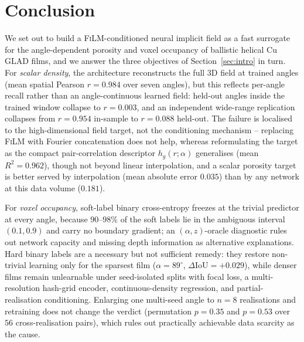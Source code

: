 \documentclass[aip,amsmath,amssymb,reprint]{revtex4-1}
\renewcommand{\ang}{\ensuremath{\alpha}} %
\newcommand{\iou}{\ensuremath{\mathrm{IoU}}}
\newcommand{\film}{\textsc{FiLM}}
\begin{document}
\section{Conclusion}
\label{sec:conclusion}

We set out to build a \film{}-conditioned neural implicit field as a fast
surrogate for the angle-dependent porosity and voxel occupancy of ballistic
helical Cu GLAD films, and we answer the three objectives of
Section~\ref{sec:intro} in turn. For \emph{scalar density}, the architecture
reconstructs the full 3D field at trained angles (mean spatial Pearson
$r = 0.984$ over seven angles), but this reflects per-angle recall rather than
an angle-continuous learned field: held-out angles inside the trained window
collapse to $r = 0.003$, and an independent wide-range replication collapses
from $r = 0.954$ in-sample to $r = 0.088$ held-out. The failure is localised to
the high-dimensional field target, not the conditioning mechanism -- replacing
\film{} with Fourier concatenation does not help, whereas reformulating the
target as the compact pair-correlation descriptor $h_g(r;\ang)$ generalises
(mean $R^2 = 0.962$), though not beyond linear interpolation, and a scalar
porosity target is better served by interpolation (mean absolute error $0.035$)
than by any network at this data volume ($0.181$).

For \emph{voxel occupancy}, soft-label binary cross-entropy freezes at the
trivial predictor at every angle, because $90$--$98\%$ of the soft labels lie in
the ambiguous interval $(0.1,0.9)$ and carry no boundary gradient; an
$(\alpha,z)$-oracle diagnostic rules out network capacity and missing depth
information as alternative explanations. Hard binary labels are a necessary but
not sufficient remedy: they restore non-trivial learning only for the sparsest
film ($\ang = 89^{\circ}$, $\Delta\iou = +0.029$), while denser films remain
unlearnable under seed-isolated splits with focal loss, a multi-resolution
hash-grid encoder, continuous-density regression, and partial-realisation
conditioning. Enlarging one multi-seed angle to $n = 8$ realisations and
retraining does not change the verdict (permutation $p = 0.35$ and $p = 0.53$
over $56$ cross-realisation pairs), which rules out practically achievable data
scarcity as the cause.
\end{document}
